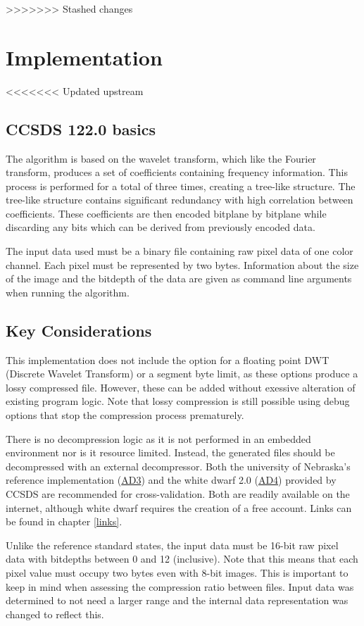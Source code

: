 \documentclass[12pt, a4paper]{article}
\begin{document}
\newpage
>>>>>>> Stashed changes
\section{Implementation}
<<<<<<< Updated upstream

\subsection{CCSDS 122.0 basics}
The algorithm is based on the wavelet transform, which like the Fourier transform, 
produces a set of coefficients containing frequency information. 
This process is performed for a total of three times, creating a tree-like structure. 
The tree-like structure contains significant redundancy with high correlation between coefficients. 
These coefficients are then encoded bitplane by bitplane while discarding any bits which can be derived from previously encoded data.

\medskip
\noindent
The input data used must be a binary file containing raw pixel data of one color channel. 
Each pixel must be represented by two bytes. 
Information about the size of the image and the bitdepth of the data are given as command line arguments when running the algorithm.

\subsection{Key Considerations}
This implementation does not include the option for a floating point 
DWT (Discrete Wavelet Transform) or a segment byte limit, 
as these options produce a lossy compressed file.
However, these can be added without exessive alteration of existing program logic.
Note that lossy compression is still possible using debug options that 
stop the compression process prematurely. 

\medskip
\noindent
There is no decompression logic as it is not performed in an embedded environment nor is it resource limited. 
Instead, the generated files should be decompressed with an external decompressor.
Both the university of Nebraska's reference implementation (\hyperref[lnk:uon]{AD3}) and 
the white dwarf 2.0 (\hyperref[lnk:wd]{AD4}) provided by CCSDS are 
recommended for cross-validation. Both are readily available on the internet, 
although white dwarf requires the creation of a free account. 
Links can be found in chapter \ref{links}.

\medskip
\noindent
Unlike the reference standard states, the input data must be 16-bit raw pixel data with bitdepths between 0 and 12 (inclusive). 
Note that this means that each pixel value must occupy two bytes even with 8-bit images. 
This is important to keep in mind when assessing the compression ratio between files. 
Input data was determined to not need a larger range and the internal data representation was changed to reflect this.
\end{document}
